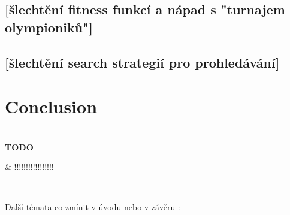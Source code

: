 \documentclass[12pt,a4paper]{report}
\newenvironment{todo}
{ ~\\[0.5em]
  {\color{red}\textbf{TODO}}
  \begin{easylist}[itemize]}
{ \end{easylist}
  ~}
\begin{document}
\section{[šlechtění fitness funkcí a nápad s "turnajem olympioniků"]}
\section{[šlechtění search strategií pro prohledávání]}




\chapter*{Conclusion}


\begin{todo}
 & !!!!!!!!!!!!!!!!!
\end{todo}


Další témata co zmínit v úvodu nebo v závěru :\\
\end{document}
